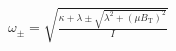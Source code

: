 \documentclass{standalone}
\begin{document}
$\omega_\pm = \sqrt{\frac{\kappa+\lambda \pm \sqrt{\lambda^2 + \left(\mu B_\text{T}\right)^2}}{I}}$
\end{document}
